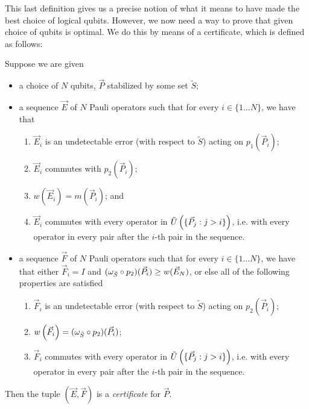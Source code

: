 \documentclass[twocolumn,showpacs,preprintnumbers,amsmath,amssymb,nofootinbib,pra,floatfix]{revtex4-1}
\newenvironment{definition}[1][Definition]{\begin{trivlist}
\item[\hskip \labelsep {\bfseries #1}]}{\end{trivlist}}
\newcommand{\lst}{\vec}
\newcommand{\set}{\tilde}
\begin{document}
\begin{comment}
Now let $l$ be the integer such that $\lst O^{(l)}_{|\lst O^{(l)}|}=o$.  For every operator $\lst O^{(l)}_i$ such that $i<|\lst O^{(l)}|$ we know that there must be an undetectable error that acts on $\lst O^{(l)}_i$ but not on $o$ since $\lst O^{(l)}_i=\lst O'^{(l)}_i$ and $o\in \set X'$.  Furthermore, every operator in $\set X$ is either an operator in $\set X'$ that commutes with $x$ or the product of $o$ with an operator that anti-commutes with $x$;  hence, there exists an undetectable error --- namely, $x$ --- that acts on $o$ but not on any operator in $\set X$.
\end{enumerate}
\end{description}

\end{proof}

\end{comment}
This last definition gives us a precise notion of what it means to have made the best choice of logical qubits.  However, we now need a way to prove that given choice of qubits is optimal.  We do this by means of a certificate, which is defined as follows:

\begin{definition}
Suppose we are given
\begin{itemize}
\item a choice of $N$ qubits, $\lst P$ stabilized by some set $\set S$;
\item a sequence $\lst E$ of $N$ Pauli operators such that for every $i\in\{1\dots N\}$, we have that
\begin{enumerate}
\item $\lst E_i$ is an undetectable error (with respect to $\set S$) acting on $p_1(\lst P_i)$;
\item $\lst E_i$ commutes with $p_2(\lst P_i)$;
\item $w(\lst E_i)=m(\lst P_i)$; and
\item $\lst E_i$ commutes with every operator in $\set U\paren{\{\lst P_j:j>i\}}$, i.e. with every operator in every pair after the $i$-th pair in the sequence.
\end{enumerate}
\item a sequence $\lst F$ of $N$ Pauli operators such that for every $i\in\{1\dots N\}$, we have that either $\lst F_i=I$ and $(\om_{\set S} \circ p_2)(\lst P_i) \ge w(\lst E_N)$, or else all of the following properties are satisfied
\begin{enumerate}
\item $\lst F_i$ is an undetectable error (with respect to $\set S$) acting on $p_2(\lst P_i)$;
\item $w\paren{\lst F_i}=(\om_{\set S} \circ p_2)(\lst P_i)$;
\item $\lst F_i$ commutes with every operator in $\set U\paren{\{\lst P_j:j>i\}}$, i.e. with every operator in every pair after the $i$-th pair in the sequence.
\end{enumerate}
\end{itemize}
Then the tuple $(\lst E,\lst F)$ is a \emph{certificate} for $\lst P$.
\end{definition}
\end{document}
